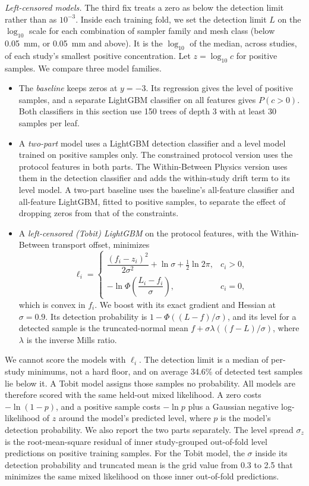 \documentclass[12pt,a4paper]{report}
\begin{document}
\emph{Left-censored models.} The third fix treats a zero as below the detection limit rather than as $10^{-3}$. Inside each training fold, we set the detection limit $L$ on the $\log_{10}$ scale for each combination of sampler family and mesh class (below 0.05~mm, or 0.05~mm and above). It is the $\log_{10}$ of the median, across studies, of each study's smallest positive concentration. Let $z=\log_{10}c$ for positive samples. We compare three model families.
\begin{itemize}
\item The \emph{baseline} keeps zeros at $y=-3$. Its regression gives the level of positive samples, and a separate LightGBM classifier on all features gives $P(c>0)$. Both classifiers in this section use 150 trees of depth 3 with at least 30 samples per leaf.
\item A \emph{two-part} model uses a LightGBM detection classifier and a level model trained on positive samples only. The constrained protocol version uses the protocol features in both parts. The Within-Between Physics version uses them in the detection classifier and adds the within-study drift term to its level model. A two-part baseline uses the baseline's all-feature classifier and all-feature LightGBM, fitted to positive samples, to separate the effect of dropping zeros from that of the constraints.
\item A \emph{left-censored (Tobit) LightGBM} on the protocol features, with the Within-Between transport offset, minimizes
\begin{equation}
\ell_i=\begin{cases}\dfrac{(f_i-z_i)^2}{2\sigma^2}+\ln\sigma+\tfrac{1}{2}\ln 2\pi, & c_i>0,\\[2mm] -\ln\Phi\!\left(\dfrac{L_i-f_i}{\sigma}\right), & c_i=0,\end{cases}
\end{equation}
which is convex in $f_i$. We boost with its exact gradient and Hessian at $\sigma=0.9$. Its detection probability is $1-\Phi((L-f)/\sigma)$, and its level for a detected sample is the truncated-normal mean $f+\sigma\lambda((f-L)/\sigma)$, where $\lambda$ is the inverse Mills ratio.
\end{itemize}
We cannot score the models with $\ell_i$. The detection limit is a median of per-study minimums, not a hard floor, and on average 34.6\% of detected test samples lie below it. A Tobit model assigns those samples no probability. All models are therefore scored with the same held-out mixed likelihood. A zero costs $-\ln(1-p)$, and a positive sample costs $-\ln p$ plus a Gaussian negative log-likelihood of $z$ around the model's predicted level, where $p$ is the model's detection probability. We also report the two parts separately. The level spread $\sigma_z$ is the root-mean-square residual of inner study-grouped out-of-fold level predictions on positive training samples. For the Tobit model, the $\sigma$ inside its detection probability and truncated mean is the grid value from 0.3 to 2.5 that minimizes the same mixed likelihood on those inner out-of-fold predictions.
\end{document}
